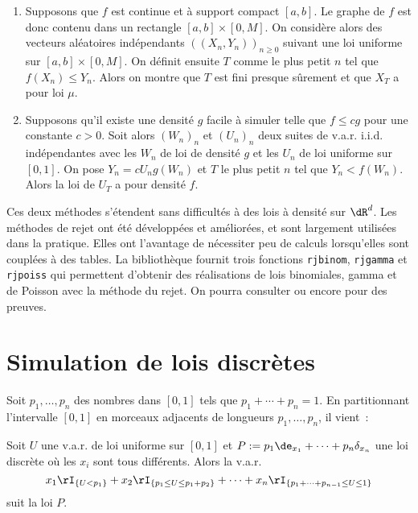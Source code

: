 \begin{enumerate}
\item Supposons que $f$ est continue et à support compact $[a,b]$. Le graphe
  de $f$ est donc contenu dans un rectangle $[a,b]× [0,M]$. On considère alors
  des vecteurs aléatoires indépendants $((X_n,Y_n))_{n\geq0}$ suivant une loi
  uniforme sur $[a,b]× [0,M]$. On définit ensuite $T$ comme le plus petit $n$
  tel que $f(X_n) \leq Y_n$. Alors on montre que $T$ est fini presque sûrement et
  que $X_T$ a pour loi $\mu$.
\item Supposons qu'il existe une densité $g$ facile à simuler telle que $f\leq c
  g$ pour une constante $c>0$. Soit alors $(W_n)_n$ et $(U_n)_n$ deux suites
  de v.a.r. i.i.d. indépendantes avec les $W_n$ de loi de densité $g$ et les
  $U_n$ de loi uniforme sur $[0,1]$.  On pose $Y_n=cU_ng(W_n)$ et $T$ le plus
  petit $n$ tel que $Y_n<f(W_n)$. Alors la loi de $U_{T}$ a pour densité $f$.
\end{enumerate}
Ces deux méthodes s'étendent sans difficultés à des lois à densité sur
$\dR^d$. Les méthodes de rejet ont été développées et améliorées, et sont
largement utilisées dans la pratique. Elles ont l'avantage de nécessiter peu
de calculs lorsqu'elles sont couplées à des tables. La bibliothèque \SB{}
fournit trois fonctions \texttt{rjbinom}, \texttt{rjgamma} et \texttt{rjpoiss}
qui permettent d'obtenir des réalisations de lois binomiales, gamma et de
Poisson avec la méthode du rejet. On pourra consulter \cite[IV.4.3, p.
79]{bouleau} ou encore \cite[VI.5.15, p. 180]{barbe-ledoux} pour des preuves.

%
\section{Simulation de lois discrètes}
%

Soit $p_1,\ldots,p_n$ des nombres dans $[0,1]$ tels que $p_1+\cdots+p_n=1$. En
partitionnant l'intervalle $[0,1]$ en morceaux adjacents de longueurs
$p_1,\ldots,p_n$, il vient~:


\begin{thm}\label{th:simdiscr}
  Soit $U$ une v.a.r. de loi uniforme sur $[0,1]$ et $P:=p_1\de_{x_1}+\cdots+p_n
  \delta_{x_n}$ une loi discrète où les $x_i$ sont tous différents. Alors la v.a.r.
  $$
  x_1 \rI_{\{U < p_1\}} 
  + x_2 \rI_{\{p_1\leq U \leq p_1+p_2\}} 
  + \cdots + x_n \rI_{\{p_1 + \cdots + p_{n-1} \leq U \leq 1\}}
  $$
  suit la loi $P$.
\end{thm}

